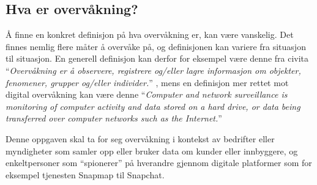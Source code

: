 \subsection{Hva er overvåkning?}
Å finne en konkret definisjon på hva overvåkning er, kan være vanskelig. Det finnes nemlig flere måter å overvåke på, og definisjonen kan variere fra situasjon til situasjon. En generell definisjon kan derfor for eksempel være denne fra civita ``\textit{Overvåkning er å observere, registrere og/eller lagre informasjon om objekter, fenomener, grupper og/eller individer.}'' \parencite{artikkel:civita_overvåkning}, mens en definisjon mer rettet mot digital overvåkning kan være denne ``\textit{Computer and network surveillance is monitoring of computer activity and data stored on a hard drive, or data being transferred over computer networks such as the Internet.}'' \parencite{artikkel:wikipedia_overvåkning}

Denne oppgaven skal ta for seg overvåkning i kontekst av bedrifter eller myndigheter som samler opp eller bruker data om kunder eller innbyggere, og enkeltpersoner som ``spionerer'' på hverandre gjennom digitale platformer som for eksempel tjenesten Snapmap til Snapchat.

\newpage